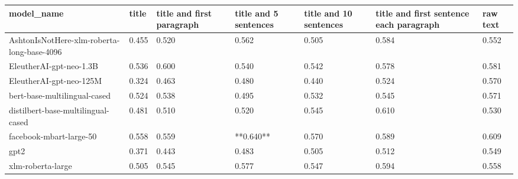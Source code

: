 \begin{tabular}{lllllll}
\toprule
                                model\_name & title & title and first paragraph & title and 5 sentences & title and 10 sentences & title and first sentence each paragraph & raw text \\
\midrule
AshtonIsNotHere-xlm-roberta-long-base-4096 & 0.455 &                     0.520 &                 0.562 &                  0.505 &                                   0.584 &    0.552 \\
                   EleutherAI-gpt-neo-1.3B & 0.536 &                     0.600 &                 0.540 &                  0.542 &                                   0.578 &    0.581 \\
                   EleutherAI-gpt-neo-125M & 0.324 &                     0.463 &                 0.480 &                  0.440 &                                   0.524 &    0.570 \\
              bert-base-multilingual-cased & 0.524 &                     0.538 &                 0.495 &                  0.532 &                                   0.545 &    0.571 \\
        distilbert-base-multilingual-cased & 0.481 &                     0.510 &                 0.520 &                  0.545 &                                   0.610 &    0.530 \\
                   facebook-mbart-large-50 & 0.558 &                     0.559 &             **0.640** &                  0.570 &                                   0.589 &    0.609 \\
                                      gpt2 & 0.371 &                     0.443 &                 0.483 &                  0.505 &                                   0.512 &    0.549 \\
                         xlm-roberta-large & 0.505 &                     0.545 &                 0.577 &                  0.547 &                                   0.594 &    0.558 \\
\bottomrule
\end{tabular}
